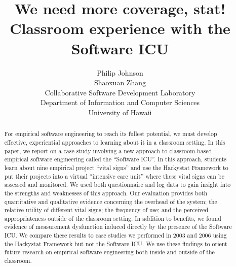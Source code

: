 \documentclass[times,10pt,twocolumn]{article}
\begin{document}
\pagestyle{empty}

\title{We need more coverage, stat!  \\
Classroom experience with the Software ICU}

\author{
Philip Johnson\\
Shaoxuan Zhang \\
Collaborative Software Development Laboratory\\
Department of Information and Computer Sciences\\
University of Hawaii\\
}


\maketitle
\begin{abstract}
For empirical software engineering to reach its fullest potential, we must
develop effective, experiential approaches to learning about it in a
classroom setting.  In this paper, we report on a case study involving a
new approach to classroom-based empirical software engineering called the
``Software ICU''.  In this approach, students learn about nine empirical
project ``vital signs'' and use the Hackystat Framework to put their
projects into a virtual ``intensive care unit'' where these vital signs can
be assessed and monitored.  We used both questionnaire and log data to gain
insight into the strengths and weaknesses of this approach. Our evaluation
provides both quantitative and qualitative evidence concerning the overhead
of the system; the relative utility of different vital signs; the frequency
of use; and the perceived appropriateness outside of the classroom
setting. In addition to benefits, we found evidence of measurement
dysfunction induced directly by the presence of the Software ICU. We
compare these results to case studies we performed in 2003 and 2006 using
the Hackystat Framework but not the Software ICU.  We use these findings to
orient future research on empirical software engineering both inside and
outside of the classroom.
\end{abstract}


\end{document}
